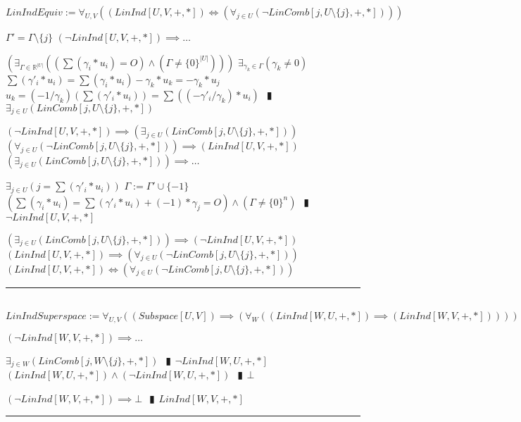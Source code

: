 \documentclass{book}
\newcommand{\abr}{:=}
\newcommand{\pipe}{$\phantom{(}\vrectangleblack\phantom{)}$}
\begin{document}
$LinIndEquiv \abr \forall_{U, V}((LinInd[U, V, +, *]) \iff (\forall_{j \in U}(\lnot LinComb[j, U \setminus \{j\}, +, *])))$
\begin{enumerate}
  \lit $\Gamma' = \Gamma \setminus \{j\}$
  \lit $(\lnot LinInd[U, V, +, *]) \implies \ldots$
  \begin{enumerate}
    \lit $(\exists_{\Gamma \in \mathbb{R}^|U|}((\sum(\gamma_i * u_i) = O) \land (\Gamma \neq \{0\}^{|U|})))$
    \lit $\exists_{\gamma_k \in \Gamma}(\gamma_k \neq 0)$
    \lit $\sum(\gamma'_i * u_i) = \sum(\gamma_i * u_i) - \gamma_k * u_k = -\gamma_k * u_j$
    \lit $u_k = (-1 / \gamma_k)(\sum(\gamma'_i * u_i)) = \sum( (-\gamma'_i / \gamma_k) * u_i)$ \pipe $\exists_{j \in U}(LinComb[j, U \setminus \{j\}, +, *])$
   \end{enumerate}
  \lit $(\lnot LinInd[U, V, +, *]) \implies (\exists_{j \in U}(LinComb[j, U \setminus \{j\}, +, *]))$
  \lit $(\forall_{j \in U}(\lnot LinComb[j, U \setminus \{j\}, +, *])) \implies (LinInd[U, V, +, *])$
  \lit $(\exists_{j \in U}(LinComb[j, U \setminus \{j\}, +, *])) \implies \ldots$
  \begin{enumerate}
    \lit $\exists_{j \in U}(j = \sum(\gamma'_i * u_i))$
    \lit $\Gamma \abr \Gamma' \cup \{-1\}$
    \lit $(\sum(\gamma_i * u_i) = \sum(\gamma'_i * u_i) + (-1) * \gamma_j = O) \land (\Gamma \neq \{0\}^n)$ \pipe $\lnot LinInd[U, V, +, *]$
  \end{enumerate}
  \lit $(\exists_{j \in U}(LinComb[j, U \setminus \{j\}, +, *])) \implies (\lnot LinInd[U, V, +, *])$
  \lit $(LinInd[U, V, +, *]) \implies (\forall_{j \in U}(\lnot LinComb[j, U \setminus \{j\}, +, *]))$
  \lit $(LinInd[U, V, +, *]) \iff (\forall_{j \in U}(\lnot LinComb[j, U \setminus \{j\}, +, *]))$
\end{enumerate} \vspace{.75mm} \hrule \vspace{.75mm} \ \\ 

$LinIndSuperspace \abr \forall_{U, V}((Subspace[U, V]) \implies (\forall_{W}((LinInd[W, U, +, *]) \implies (LinInd[W, V, +, *]))))$
\begin{enumerate}
  \lit $(\lnot LinInd[W, V, +, *]) \implies \ldots$
  \begin{enumerate}
    \lit $\exists_{j \in W}(LinComb[j, W \setminus \{j\}, +, *])$ \pipe $\lnot LinInd[W, U, +, *]$
    \lit $(LinInd[W, U, +, *]) \land (\lnot LinInd[W, U, +, *])$ \pipe $\bot$
  \end{enumerate}
  \lit $(\lnot LinInd[W, V, +, *]) \implies \bot$ \pipe $LinInd[W, V, +, *]$
\end{enumerate} \vspace{.75mm} \hrule \vspace{.75mm} \ \\ 
\end{document}
